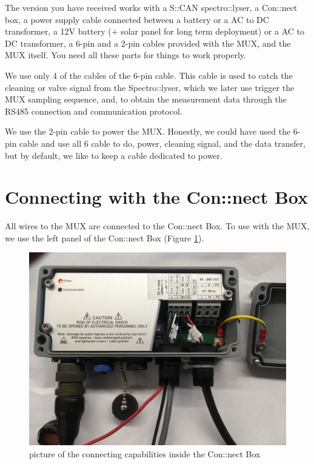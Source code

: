 \documentclass[]{book}
\begin{document}
The version you have received works with a S::CAN spectro::lyser, a Con::nect box, a power supply cable connected between a battery or a AC to DC transformer, a 12V battery (+ solar panel for long term deployment) or a AC to DC transformer, a 6-pin and a 2-pin cables provided with the MUX, and the MUX itself. You need all these parts for things to work properly.

We use only 4 of the cables of the 6-pin cable. This cable is used to catch the cleaning or valve signal from the Spectro::lyser, which we later use trigger the MUX sampling sequence, and, to obtain the measurement data through the RS485 connection and communication protocol.

We use the 2-pin cable to power the MUX. Honestly, we could have used the 6-pin cable and use all 6 cable to do, power, cleaning signal, and the data transfer, but by default, we like to keep a cable dedicated to power.

\hypertarget{connecting-with-the-connect-box}{%
\section{Connecting with the Con::nect Box}\label{connecting-with-the-connect-box}}

All wires to the MUX are connected to the Con::nect Box. To use with the MUX, we use the left panel of the Con::nect Box (Figure \ref{fig:connectboxfull}).

\begin{figure}

{\centering \includegraphics[width=0.7\linewidth]{pictures/ConnectBoxFull} 

}

\caption{picture of the connecting capabilities inside the Con::nect Box}\label{fig:connectboxfull}
\end{figure}
\end{document}
